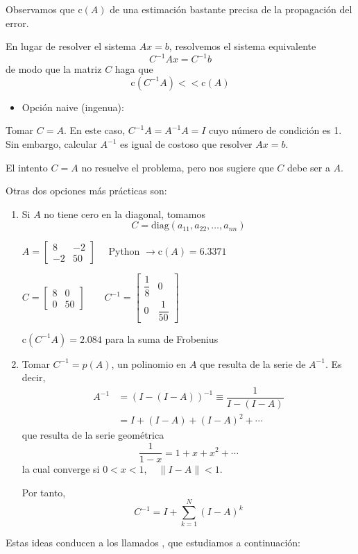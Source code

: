 Observamos que $\mathrm{c}(A)$ de una estimación bastante precisa de la propagación del error.


En lugar de resolver el sistema $Ax=b$, resolvemos el sistema equivalente \[ C^{-1}Ax=C^{-1}b \]de modo que la matriz $C$ haga que \[ \mathrm{c}(C^{-1}A)<<\mathrm{c}(A) \]
\begin{itemize}[label=\color{red}\textbullet, leftmargin=*]
	\item \color{lightblue}Opción naive (ingenua):
\end{itemize}
Tomar $C=A$. En este caso, $C^{-1}A=A^{-1}A=I$ cuyo número de condición es 1. Sin embargo, calcular $A^{-1}$ es igual de costoso que resolver $Ax=b$.

El intento $C=A$ no resuelve el problema, pero nos sugiere que $C$ debe ser  a $A$.

Otras dos opciones más prácticas son:
\begin{enumerate}[label=\color{lightblue}\arabic*)]
	\item Si $A$ no tiene cero en la diagonal, tomamos \[ C=\mathrm{diag}(a_{11},a_{22},\dots,a_{nn}) \]
	\Ej
	
	$A=\begin{bmatrix}
		8 & -2\\
		-2 & 50
	\end{bmatrix}\quad$ Python $\longrightarrow\mathrm{c}(A)=6.3371$
	
	$C=\begin{bmatrix}
		8 & 0\\
		0 & 50
	\end{bmatrix}\qquad C^{-1}=\begin{bmatrix}
	\dfrac{1}{8} & 0\\
	0 & \dfrac{1}{50}
	\end{bmatrix}$
	
	$\mathrm{c}(C^{-1}A)=2.084$ para la suma de Frobenius
	\item Tomar $C^{-1}= p(A)$, un polinomio en $A$ que resulta de  la serie de $A^{-1}$. Es decir, \begin{align*}
		A^{-1}&=\left(I-(I-A)\right)^{-1}\equiv\dfrac{1}{I-(I-A)}\\
		&=I+(I-A)+(I-A)^2+\cdots
	\end{align*}que resulta de la serie geométrica\[ \dfrac{1}{1-x}=1+x+x^2+\cdots \]la cual converge si $0<x<1,\quad\|I-A\|<1$.
	
	Por tanto, \[ C^{-1}=I+\sum_{k=1}^{N}(I-A)^k \]
\end{enumerate}
Estas ideas conducen a los llamados , que estudiamos a continuación:

